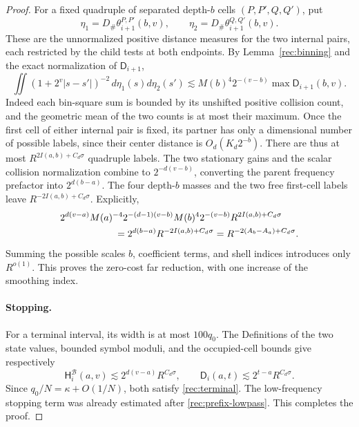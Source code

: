 \begin{proof}
For a fixed quadruple of separated depth-\(b\) cells \((P,P',Q,Q')\),
put
\[
 \eta_1=D_\#\theta_{i+1}^{P,P'}(b,v),\qquad
 \eta_2=D_\#\theta_{i+1}^{Q,Q'}(b,v).
\]
These are the unnormalized positive distance measures for the two
internal pairs, each restricted by the child tests at both endpoints.
By Lemma~\ref{rec:binning} and the exact normalization of
\(\mathsf D_{i+1}\),
\[
 \iint(1+2^v|s-s'|)^{-2}\,d\eta_1(s)d\eta_2(s')
 \lesssim M(b)^4 2^{-(v-b)}
              \max\mathsf D_{i+1}(b,v).
\]
Indeed each bin-square sum is bounded by its unshifted positive
collision count, and the geometric mean of the two counts is at
most their maximum.  Once the first cell of either internal pair
is fixed, its partner has only a dimensional number of possible
labels, since their center distance is \(O_d(K_d2^{-b})\).
There are thus at most \(R^{2I(a,b)+C_d\sigma}\) quadruple labels.
The two stationary gains and the scalar collision normalization combine
to \(2^{-d(v-b)}\), converting the parent frequency prefactor into
\(2^{d(b-a)}\).  The four depth-\(b\) masses and the two free first-cell
labels leave \(R^{-2I(a,b)+C_d\sigma}\).  Explicitly,
\begin{align*}
 &2^{d(v-a)}M(a)^{-4}
   2^{-(d-1)(v-b)}
   M(b)^4 2^{-(v-b)}R^{2I(a,b)+C_d\sigma}\\
 &\hspace{20mm}
 =2^{d(b-a)}R^{-2I(a,b)+C_d\sigma}
 =R^{-2(A_b-A_a)+C_d\sigma}.
\end{align*}
Summing the possible scales \(b\), coefficient terms, and shell
indices introduces only \(R^{o(1)}\).  This proves the zero-cost
far reduction, with one increase of the smoothing index.

\paragraph{Stopping.}
For a terminal interval, its width is at most \(100q_0\).
The Definitions of the two state values, bounded symbol
moduli, and the occupied-cell bounds give respectively
\[
 \mathsf H_i^{\mathcal B}(a,v)\lesssim2^{d(v-a)}R^{C_d\sigma},\qquad
 \mathsf D_i(a,t)\lesssim2^{t-a}R^{C_d\sigma}.
\]
Since \(q_0/N=\kappa+O(1/N)\), both satisfy
\eqref{rec:terminal}.  The low-frequency stopping term was already
estimated after \eqref{rec:prefix-lowpass}.  This completes the proof.
\end{proof}
